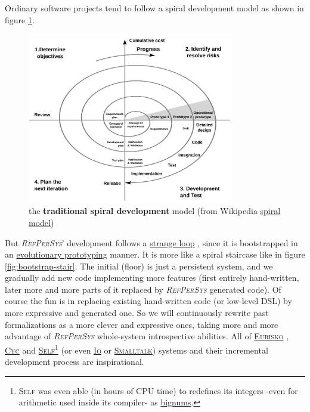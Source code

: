 \documentclass[11pt,a4paper,svgnames]{article}
\newcommand{\RefPerSys}{{\textit{\textsc{RefPerSys}}}}
\begin{document}
Ordinary software projects tend to follow a spiral development model
\cite{boehm:1988:spiral} as shown in figure \ref{fig:tradspiral}.
%
\begin{figure}[h]
  \begin{center}
    \includegraphics[width=0.8\textwidth]{spiral-model-softdevel}
  \end{center}
  \caption{the \textbf{traditional spiral development} model (from Wikipedia \href{https://en.wikipedia.org/wiki/Spiral_model}{spiral model})}
  \label{fig:tradspiral}
\end{figure}
%
But \RefPerSys' development follows a
\href{https://en.wikipedia.org/wiki/Strange_loop}{strange loop}
\cite{hofstadter:2007:strange-loop}, since it is bootstrapped in an
\href{https://en.wikipedia.org/wiki/Software\_prototyping\#Evolutionary\_prototyping}{evolutionary
  prototyping} manner. It is more like a spiral staircase like in
figure \ref{fig:bootstrap-stair}. The initial (floor) is just a
persistent system, and we gradually add new code implementing more
features (first entirely hand-written, later more and more parts of it
replaced by {\RefPerSys} generated code). Of course the fun is in
replacing existing hand-written code (or low-level DSL) by more
expressive and generated one. So we will continuously rewrite past
formalizations as a more clever and expressive ones, taking more and
more advantage of {\RefPerSys} whole-system introspective abilities.
All of \href{https://en.wikipedia.org/wiki/Eurisko}{\textsc{Eurisko}}
\cite{Lenat:1983:Eurisko},
\href{https://en.wikipedia.org/wiki/Cyc}{\textsc{Cyc}}
\cite{Lenat:1991:ev-cycl} and
\href{https://en.wikipedia.org/wiki/Self\_(programming_language)}{\textsc{Self}}\footnote{\textsc{Self}
was even able (in hours of CPU time) to redefines its integers -even
for arithmetic used inside its compiler- as
\href{https://en.wikipedia.org/wiki/Arbitrary-precision_arithmetic}{bignums}.}
\cite{chambers:1991:efficient} (or even
\href{https://iolanguage.org/}{\textsc{Io}} or
\href{https://en.wikipedia.org/wiki/Smalltalk}{\textsc{Smalltalk}})
systems and their incremental development process are inspirational.
\end{document}
